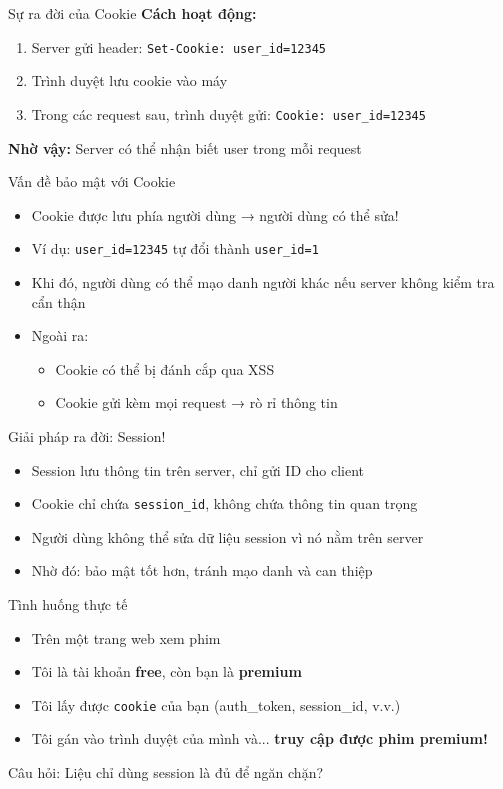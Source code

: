 \documentclass[aspectratio=169]{beamer}
\begin{document}
\begin{frame}{Sự ra đời của Cookie}
  \textbf{Cách hoạt động:}
  \begin{enumerate}
    \item Server gửi header: \texttt{Set-Cookie: user\_id=12345}
    \item Trình duyệt lưu cookie vào máy
    \item Trong các request sau, trình duyệt gửi: \texttt{Cookie: user\_id=12345}
  \end{enumerate}

  \vspace{0.5em}
  \textbf{Nhờ vậy:} Server có thể nhận biết user trong mỗi request
\end{frame}

\begin{frame}{Vấn đề bảo mật với Cookie}
  \begin{itemize}
    \item Cookie được lưu phía người dùng → người dùng có thể sửa!
    \item Ví dụ: \texttt{user\_id=12345} tự đổi thành \texttt{user\_id=1}
    \item Khi đó, người dùng có thể mạo danh người khác nếu server không kiểm tra cẩn thận
    \item Ngoài ra:
    \begin{itemize}
      \item Cookie có thể bị đánh cắp qua XSS
      \item Cookie gửi kèm mọi request → rò rỉ thông tin
    \end{itemize}
  \end{itemize}
\end{frame}

\begin{frame}{Giải pháp ra đời: Session!}
  \begin{itemize}
    \item Session lưu thông tin trên server, chỉ gửi ID cho client
    \item Cookie chỉ chứa \texttt{session\_id}, không chứa thông tin quan trọng
    \item Người dùng không thể sửa dữ liệu session vì nó nằm trên server
    \item Nhờ đó: bảo mật tốt hơn, tránh mạo danh và can thiệp
  \end{itemize}
\end{frame}

\begin{frame}{Tình huống thực tế 🤔}
\begin{itemize}
  \item Trên một trang web xem phim
  \item Tôi là tài khoản \textbf{free}, còn bạn là \textbf{premium}
  \item Tôi lấy được \texttt{cookie} của bạn (auth\_token, session\_id, v.v.)
  \item Tôi gán vào trình duyệt của mình và... \textbf{truy cập được phim premium!}
\end{itemize}

\vspace{1em}
\alert{Câu hỏi:} Liệu chỉ dùng session là đủ để ngăn chặn?
\end{frame}
\end{document}
